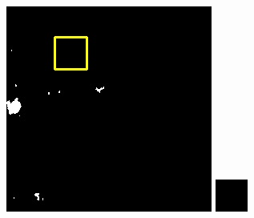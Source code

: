 \documentclass[10pt]{ctexart}
\begin{document}
\begin{multicols}{2}
\begin{figure}[H]
{\begin{minipage}[b]{0.15\linewidth}
            \includegraphics[width=1\linewidth]{../log/spoon2/cut2/LC81620432014072LGN00_16329_mask.jpg}\vspace{4pt}
            \includegraphics[width=1\linewidth]{../log/spoon2/cut2/tmp_cut_LC81620432014072LGN00_16329_mask.jpg}\vspace{4pt}

\end{minipage}}
\end{figure}
\end{multicols}
\end{document}
